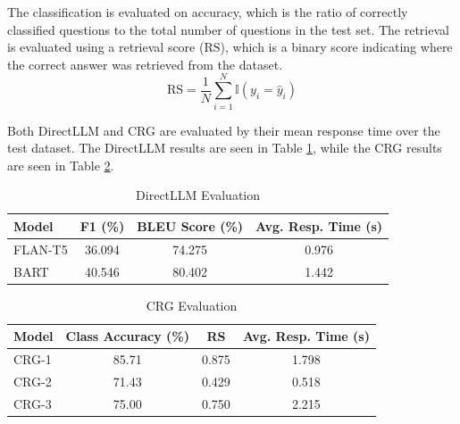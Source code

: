 \documentclass[conference]{IEEEtran}
\begin{document}
The classification is evaluated on accuracy, which is the ratio of correctly classified questions to the total number of questions in the test set.
The retrieval is evaluated using a retrieval score ($\text{RS}$), which is a binary score indicating where the correct answer was retrieved from the dataset. 
\begin{equation}
    \text{RS} = \frac{1}{N} \sum_{i=1}^{N} \mathbb{I}(y_i = \hat{y}_i)
\end{equation}

Both DirectLLM and CRG are evaluated by their mean response time over the test dataset.
The DirectLLM results are seen in Table \ref{tab:directllm_results}, while the CRG results are seen in Table \ref{tab:crg_results}.

\begin{table}[!ht]
    \centering
    \caption{DirectLLM Evaluation}
    \label{tab:directllm_results}
    \begin{tabular}{l|c|c|c}
        \toprule
        \textbf{Model} & \textbf{F1 (\%)} & \textbf{BLEU Score (\%)} & \textbf{Avg. Resp. Time (s)} \\
        \midrule
        FLAN-T5        & 36.094                 & 74.275                   & 0.976                          \\
        BART           & 40.546                 & 80.402                   & 1.442                          \\
        \bottomrule
    \end{tabular}
\end{table}

\begin{table}[!ht]
    \centering
    \caption{CRG Evaluation}
    \label{tab:crg_results}
    \begin{tabular}{l|c|c|c}
        \toprule
        \textbf{Model} & \textbf{Class Accuracy (\%)} & \textbf{RS} & \textbf{Avg. Resp. Time (s)} \\
        \midrule
        CRG-1 & 85.71 & 0.875 & 1.798 \\
        CRG-2 & 71.43 & 0.429 & 0.518 \\
        CRG-3 & 75.00 & 0.750 & 2.215 \\
        \bottomrule
    \end{tabular}
\end{table}

\end{document}
